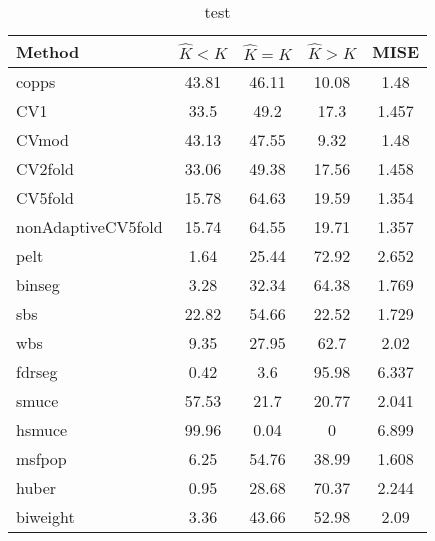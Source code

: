 \begin{table}[ht]
\centering
\begin{tabular}{l|cccc}
  \hline
Method & $\hat{K} < K$ & $\hat{K} = K$ & $\hat{K} > K$ & MISE \\ 
  \hline
copps & 43.81 & 46.11 & 10.08 &  1.48 \\ 
  CV1 &  33.5 &  49.2 &  17.3 & 1.457 \\ 
  CVmod & 43.13 & 47.55 &  9.32 &  1.48 \\ 
  CV2fold & 33.06 & 49.38 & 17.56 & 1.458 \\ 
  CV5fold & 15.78 & 64.63 & 19.59 & 1.354 \\ 
  nonAdaptiveCV5fold & 15.74 & 64.55 & 19.71 & 1.357 \\ 
  pelt &  1.64 & 25.44 & 72.92 & 2.652 \\ 
  binseg &  3.28 & 32.34 & 64.38 & 1.769 \\ 
  sbs & 22.82 & 54.66 & 22.52 & 1.729 \\ 
  wbs &  9.35 & 27.95 &  62.7 &  2.02 \\ 
  fdrseg &  0.42 &   3.6 & 95.98 & 6.337 \\ 
  smuce & 57.53 &  21.7 & 20.77 & 2.041 \\ 
  hsmuce & 99.96 &  0.04 &     0 & 6.899 \\ 
  msfpop &  6.25 & 54.76 & 38.99 & 1.608 \\ 
  huber &  0.95 & 28.68 & 70.37 & 2.244 \\ 
  biweight &  3.36 & 43.66 & 52.98 &  2.09 \\ 
   \hline
\end{tabular}
\caption{test} 
\end{table}
